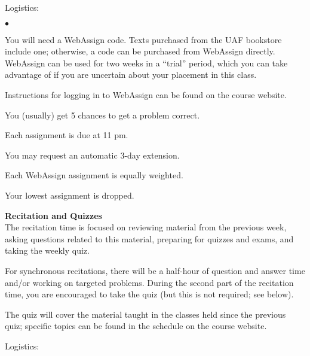 \documentclass[12pt]{article}
\renewcommand{\emph}[1]{\textsf{\textbf{#1}}}
\newcommand{\localhead}[1]{\par\smallskip\textbf{#1}\nobreak\\}%
\def\heading#1{\localhead{\large\emph{#1}}}
\newenvironment{clist}%
{\bgroup\parskip 0pt\begin{list}{$\bullet$}{\partopsep 4pt\topsep 0pt\itemsep -2pt}}%
{\end{list}\egroup}%
\begin{document}

Logistics:

\begin{clist}
\item You will need a WebAssign code.  Texts purchased from the UAF 
bookstore include one; otherwise, a code can be purchased from
WebAssign directly. WebAssign can be used for two weeks in a ``trial''
period, which you can take advantage of if you are uncertain about
your placement in this class.
\item Instructions for logging in to WebAssign can be found on the course website.
\item You (usually) get 5 chances to get a problem correct. 
\item Each assignment is due at 11 pm. 
\item You may request an automatic 3-day extension.%
\item Each WebAssign assignment is equally weighted. 
\item Your lowest assignment is dropped.
\end{clist}

\heading{Recitation and Quizzes}
The recitation time is focused on reviewing material from the previous week, asking questions related to this material, preparing for quizzes and exams, and taking the weekly quiz.

For synchronous recitations, there will be a half-hour of question and answer time and/or working on targeted problems. During the second part of the recitation time, you are encouraged to take the quiz (but this is not required; see below).

The quiz will cover the material taught in the classes held since the previous quiz; specific topics can be found in the schedule on the course website.  

Logistics:
\end{document}
